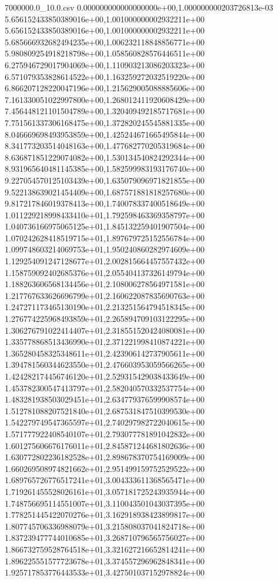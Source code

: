 \begin{filecontents*}{7000000.0_10.0.csv}
0.000000000000000000e+00,1.000000000203726813e-03
5.656152433850389016e+00,1.001000000002932211e+00
5.656152433850389016e+00,1.001000000002932211e+00
5.685666932682494235e+00,1.006232118848856771e+00
5.980809254918218798e+00,1.058560828576446511e+00
6.275946729017904069e+00,1.110903213086203323e+00
6.571079353828614522e+00,1.163259272032519220e+00
6.866207128220047196e+00,1.215629005088885606e+00
7.161330051022997800e+00,1.268012411920608429e+00
7.456448121101504789e+00,1.320409492185717681e+00
7.751561337306168475e+00,1.372820245545881335e+00
8.046669698493953859e+00,1.425244671665495844e+00
8.341773203514048163e+00,1.477682770205319684e+00
8.636871851229074082e+00,1.530134540824292344e+00
8.931965640481145385e+00,1.582599983193176740e+00
9.227054570125103439e+00,1.635079096971821855e+00
9.522138639021454409e+00,1.687571881818257680e+00
9.817217846019378413e+00,1.740078337400518649e+00
1.011229218998433410e+01,1.792598463369358797e+00
1.040736166975065125e+01,1.845132259401907504e+00
1.070242628418519715e+01,1.897679725152556784e+00
1.099748603214069753e+01,1.950240860282974609e+00
1.129254091247128677e+01,2.002815664457557432e+00
1.158759092402685376e+01,2.055404137326149794e+00
1.188263606568134456e+01,2.108006278564971581e+00
1.217767633626696799e+01,2.160622087835690763e+00
1.247271173465130190e+01,2.213251564794518345e+00
1.276774225968493859e+01,2.265894709103122295e+00
1.306276791022414407e+01,2.318551520424080081e+00
1.335778868513436990e+01,2.371221998410874221e+00
1.365280458325348611e+01,2.423906142737905611e+00
1.394781560344623550e+01,2.476603953059566265e+00
1.424282174456746120e+01,2.529315429038433649e+00
1.453782300547413797e+01,2.582040570332537754e+00
1.483281938503029451e+01,2.634779376599908574e+00
1.512781088207521840e+01,2.687531847510399530e+00
1.542279749547365597e+01,2.740297982722040615e+00
1.571777922408540107e+01,2.793077781891042832e+00
1.601275606676176011e+01,2.845871244681802636e+00
1.630772802236182528e+01,2.898678370754169009e+00
1.660269508974821662e+01,2.951499159752529522e+00
1.689765726776517241e+01,3.004333611368565471e+00
1.719261455528026161e+01,3.057181725243935944e+00
1.748756695114551007e+01,3.110043501043037395e+00
1.778251445422070276e+01,3.162918938423899817e+00
1.807745706336988079e+01,3.215808037041824718e+00
1.837239477744010685e+01,3.268710796565756027e+00
1.866732759528764518e+01,3.321627216652814241e+00
1.896225551577723678e+01,3.374557296962848341e+00
1.925717853776443533e+01,3.427501037152978824e+00

\end{filecontents*}
